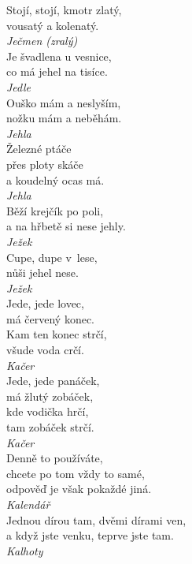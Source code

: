 \begin{multicols}{\value{columnsthindata}}
\noindent
Stojí, stojí, kmotr zlatý,\\
vousatý a kolenatý.\\[1 mm]
{\sl Ječmen (zralý)}\\

\noindent
Je švadlena u vesnice,\\
co má jehel na tisíce.\\[1 mm]
{\sl Jedle}\\

\noindent
Ouško mám a neslyším,\\
nožku mám a neběhám.\\[1 mm]
{\sl Jehla}\\

\noindent
Železné ptáče\\
přes ploty skáče\\
a koudelný ocas má.\\[1 mm]
{\sl Jehla}\\

\noindent
Běží krejčík po poli,\\
a na hřbetě si nese jehly.\\[1 mm]
{\sl Ježek}\\

\noindent
Cupe, dupe v~lese,\\
nůši jehel nese.\\[1 mm]
{\sl Ježek}\\

\noindent
Jede, jede lovec,\\
má červený konec.\\
Kam ten konec strčí,\\
všude voda crčí.\\[1 mm]
{\sl Kačer}\\

\noindent
Jede, jede panáček,\\
má žlutý zobáček,\\
kde vodička hrčí,\\
tam zobáček strčí.\\[1 mm]
{\sl Kačer}\\

\noindent
Denně to používáte,\\
chcete po tom vždy to samé,\\
odpověď je však pokaždé jiná.\\[1 mm]
{\sl Kalendář}\\

\noindent
Jednou dírou tam, dvěmi dírami ven,\\
a když jste venku, teprve jste tam.\\[1 mm]
{\sl Kalhoty}\\


\end{multicols}
